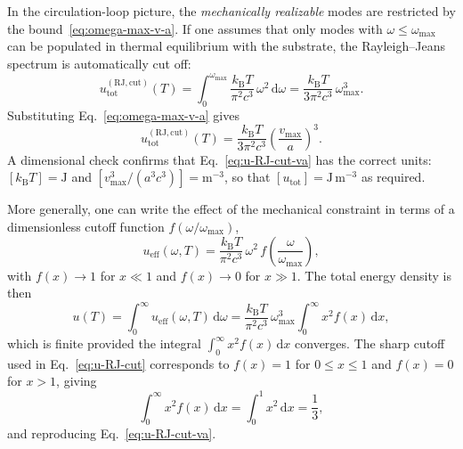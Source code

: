 \documentclass[11pt]{article}
\begin{document}
            In the circulation-loop picture, the \emph{mechanically realizable} modes are restricted
            by the bound~\eqref{eq:omega-max-v-a}. If one assumes that only modes with
            $\omega\le\omega_{\max}$ can be populated in thermal equilibrium with the substrate, the
            Rayleigh--Jeans spectrum is automatically cut off:
            \begin{equation}
                u_{\mathrm{tot}}^{(\mathrm{RJ,cut})}(T)
                = \int_0^{\omega_{\max}}
                \frac{k_{\mathrm B}T}{\pi^2 c^3}\,\omega^2\,\mathrm{d}\omega
                = \frac{k_{\mathrm B}T}{3\pi^2 c^3}\,\omega_{\max}^3.
                \label{eq:u-RJ-cut}
            \end{equation}
            Substituting Eq.~\eqref{eq:omega-max-v-a} gives
            \begin{equation}
                u_{\mathrm{tot}}^{(\mathrm{RJ,cut})}(T)
                = \frac{k_{\mathrm B}T}{3\pi^2 c^3}
                \left(\frac{v_{\max}}{a}\right)^3.
                \label{eq:u-RJ-cut-va}
            \end{equation}
            A dimensional check confirms that Eq.~\eqref{eq:u-RJ-cut-va} has the correct units:
            $[k_{\mathrm B}T] = \mathrm{J}$ and $[v_{\max}^3/(a^3 c^3)] = \mathrm{m}^{-3}$, so that
            $[u_{\mathrm{tot}}] = \mathrm{J\,m^{-3}}$ as required.

            More generally, one can write the effect of the mechanical constraint in terms of a
            dimensionless cutoff function $f(\omega/\omega_{\max})$,
            \begin{equation}
                u_{\mathrm{eff}}(\omega,T)
                = \frac{k_{\mathrm B}T}{\pi^2 c^3}\,\omega^2\,
                f\!\left(\frac{\omega}{\omega_{\max}}\right),
            \end{equation}
            with $f(x)\to 1$ for $x\ll 1$ and $f(x)\to 0$ for $x\gg 1$. The total energy density is
            then
            \begin{equation}
                u(T)
                = \int_0^\infty u_{\mathrm{eff}}(\omega,T)\,\mathrm{d}\omega
                = \frac{k_{\mathrm B}T}{\pi^2 c^3}\,\omega_{\max}^3
                \int_0^\infty x^2 f(x)\,\mathrm{d}x,
            \end{equation}
            which is finite provided the integral $\int_0^\infty x^2 f(x)\,\mathrm{d}x$ converges.
            The sharp cutoff used in Eq.~\eqref{eq:u-RJ-cut} corresponds to
            $f(x) = 1$ for $0\le x\le 1$ and $f(x)=0$ for $x>1$, giving
            \begin{equation}
                \int_0^\infty x^2 f(x)\,\mathrm{d}x
                = \int_0^1 x^2\,\mathrm{d}x = \frac{1}{3},
            \end{equation}
            and reproducing Eq.~\eqref{eq:u-RJ-cut-va}.
\end{document}
